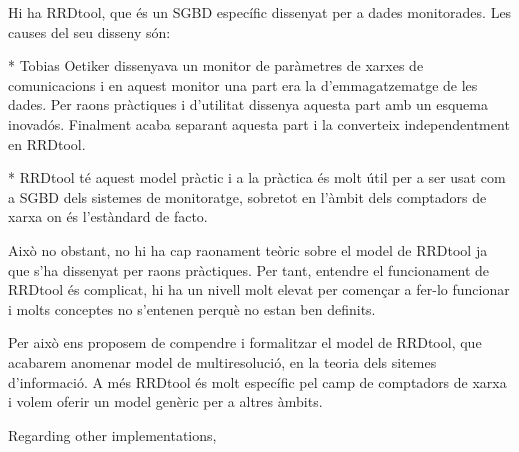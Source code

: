 
Hi ha RRDtool, que és un SGBD específic dissenyat per a dades monitorades. Les causes del seu disseny són:

* Tobias Oetiker dissenyava un monitor de paràmetres de xarxes de comunicacions i en aquest monitor una part era la d'emmagatzematge de les dades. Per raons pràctiques i d'utilitat dissenya aquesta part amb un esquema inovadós. Finalment acaba separant aquesta part i la converteix independentment en RRDtool.

* RRDtool té aquest model pràctic i a la pràctica és molt útil per a ser usat com a SGBD dels sistemes de monitoratge, sobretot en l'àmbit dels comptadors de xarxa on és l'estàndard de facto. 

Això no obstant, no hi ha cap raonament teòric sobre el model de RRDtool ja que s'ha dissenyat per raons pràctiques. Per tant, entendre el funcionament de RRDtool és complicat, hi ha un nivell molt elevat per començar a fer-lo funcionar i molts conceptes no s'entenen perquè no estan ben definits. 

Per això ens proposem de compendre i formalitzar el model de RRDtool, que acabarem anomenar model de multiresolució, en la teoria dels sitemes d'informació. A més RRDtool és molt específic pel camp de comptadors de xarxa i volem oferir un model genèric per a altres àmbits.  






Regarding other implementations,




